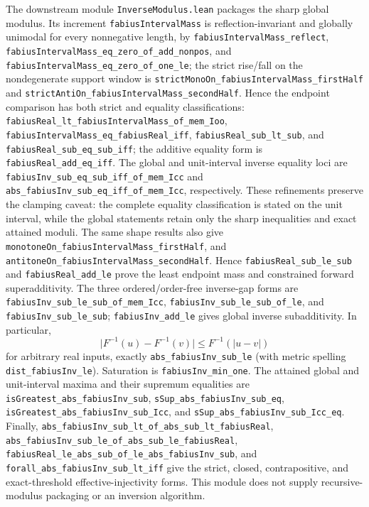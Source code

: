 \documentclass[11pt,oneside]{article}
\theoremstyle{definition}
\theoremstyle{remark}
\begin{document}
The downstream module \nolinkurl{InverseModulus.lean} packages the sharp
global modulus.  Its increment
\nolinkurl{fabiusIntervalMass} is reflection-invariant and globally unimodal
for every nonnegative length, by
\nolinkurl{fabiusIntervalMass_reflect},
\nolinkurl{fabiusIntervalMass_eq_zero_of_add_nonpos}, and
\nolinkurl{fabiusIntervalMass_eq_zero_of_one_le}; the strict rise/fall on the
nondegenerate support window is
\nolinkurl{strictMonoOn_fabiusIntervalMass_firstHalf} and
\nolinkurl{strictAntiOn_fabiusIntervalMass_secondHalf}.
Hence the endpoint comparison has both strict and equality classifications:
\nolinkurl{fabiusReal_lt_fabiusIntervalMass_of_mem_Ioo},
\nolinkurl{fabiusIntervalMass_eq_fabiusReal_iff},
\nolinkurl{fabiusReal_sub_lt_sub}, and
\nolinkurl{fabiusReal_sub_eq_sub_iff}; the additive equality form is
\nolinkurl{fabiusReal_add_eq_iff}.
The global and unit-interval inverse equality loci are
\nolinkurl{fabiusInv_sub_eq_sub_iff_of_mem_Icc} and
\nolinkurl{abs_fabiusInv_sub_eq_iff_of_mem_Icc}, respectively.  These
refinements preserve the clamping caveat: the complete equality classification
is stated on the unit interval, while the global statements retain only the
sharp inequalities and exact attained moduli.
The same shape results also give
\nolinkurl{monotoneOn_fabiusIntervalMass_firstHalf}, and
\nolinkurl{antitoneOn_fabiusIntervalMass_secondHalf}.  Hence
\nolinkurl{fabiusReal_sub_le_sub} and \nolinkurl{fabiusReal_add_le} prove the
least endpoint mass and constrained forward superadditivity.  The three
ordered/order-free inverse-gap forms are
\nolinkurl{fabiusInv_sub_le_sub_of_mem_Icc},
\nolinkurl{fabiusInv_sub_le_sub_of_le}, and
\nolinkurl{fabiusInv_sub_le_sub}; \nolinkurl{fabiusInv_add_le} gives global
inverse subadditivity.  In particular,
\[
 \lvert F^{-1}(u)-F^{-1}(v)\rvert
 \le F^{-1}(\lvert u-v\rvert)
\]
for arbitrary real inputs, exactly
\nolinkurl{abs_fabiusInv_sub_le} (with metric spelling
\nolinkurl{dist_fabiusInv_le}).  Saturation is
\nolinkurl{fabiusInv_min_one}.  The attained global and unit-interval maxima
and their supremum equalities are
\nolinkurl{isGreatest_abs_fabiusInv_sub},
\nolinkurl{sSup_abs_fabiusInv_sub_eq},
\nolinkurl{isGreatest_abs_fabiusInv_sub_Icc}, and
\nolinkurl{sSup_abs_fabiusInv_sub_Icc_eq}.  Finally,
\nolinkurl{abs_fabiusInv_sub_lt_of_abs_sub_lt_fabiusReal},
\nolinkurl{abs_fabiusInv_sub_le_of_abs_sub_le_fabiusReal},
\nolinkurl{fabiusReal_le_abs_sub_of_le_abs_fabiusInv_sub}, and
\nolinkurl{forall_abs_fabiusInv_sub_lt_iff} give the strict, closed,
contrapositive, and exact-threshold effective-injectivity forms.  This module
does not supply recursive-modulus packaging or an inversion algorithm.
\end{document}
